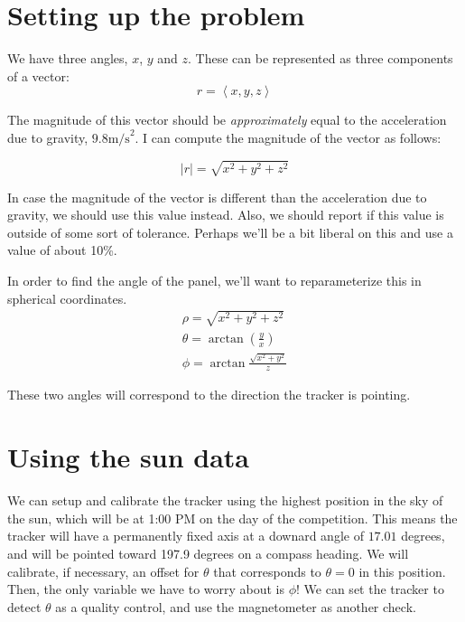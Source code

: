 \documentclass{article}
\begin{document}
\section{Setting up the problem}
We have three angles, \(x\), \(y\) and \(z\). These can be represented as three
components of a vector:
\[ r = \left\langle x, y, z \right\rangle \]

The magnitude of this vector should be \emph{approximately} equal to the
acceleration due to gravity, \(9.8{\mbox{m/s}}^2\). I can compute the magnitude
of the vector as follows:

\[ |r| = \sqrt{x^2 + y^2 + z^2} \]

In case the magnitude of the vector is different than the acceleration due to
gravity, we should use this value instead. Also, we should report if this value
is outside of some sort of tolerance. Perhaps we'll be a bit liberal on this and
use a value of about 10\%.

In order to find the angle of the panel, we'll want to reparameterize this in
spherical coordinates.
\begin{align*}
  \rho = \sqrt{x^2 + y^2 + z^2} \\
  \theta = \arctan\left(\frac{y}{x}\right) \\
  \phi = \arctan \frac{\sqrt{x^2 + y^2}}{z}
\end{align*}

These two angles will correspond to the direction the tracker is pointing.

\section{Using the sun data}

We can setup and calibrate the tracker using the highest position in the sky of
the sun, which will be at 1:00 PM on the day of the competition. This means the
tracker will have a permanently fixed axis at a downard angle of \(17.01\)
degrees, and will be pointed toward 197.9 degrees on a compass heading. We will
calibrate, if necessary, an offset for \(\theta\) that corresponds to \(\theta =
0\) in this position. Then, the only variable we have to worry about is
\(\phi\)! We can set the tracker to detect \(\theta\) as a quality control, and
use the magnetometer as another check.
\end{document}

